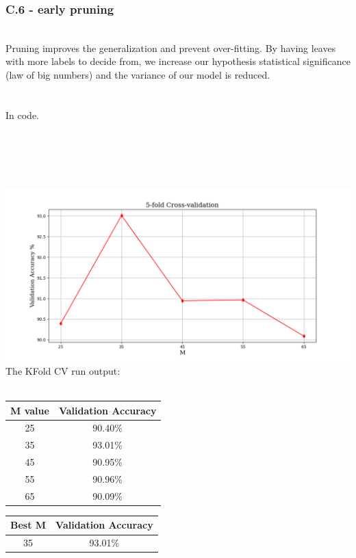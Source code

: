\documentclass[12pt]{article}
\begin{document}
\subsubsection*{C.6 - early pruning}
\\
Pruning improves the generalization and prevent over-fitting. By having leaves with more labels to decide from, we increase our hypothesis statistical significance (law of big numbers) and the variance of our model is reduced.\\
\\
\\
In code.\\
\\
\newpage
{}\\
\\
\\
\\
\includegraphics[scale=0.4]{hw3/plots/cv4.png}
\\
The KFold CV run output:\\
\\
\begin{center}
\begin{tabular}{ ||c|c|| } 
 \hline
 M value & Validation Accuracy \\ 
 \hline
 25 & 90.40\% \\ 
 35 & 93.01\% \\ 
 45 & 90.95\% \\ 
 55 & 90.96\% \\ 
 65 & 90.09\% \\ 
 \hline
\end{tabular}
\end{center}
\begin{center}
\begin{tabular}{ ||c|c|| } 
 \hline
Best M  & Validation Accuracy \\ 
 \hline
 35 & 93.01\% \\ 
 \hline
\end{tabular}
\end{center}
\end{document}
